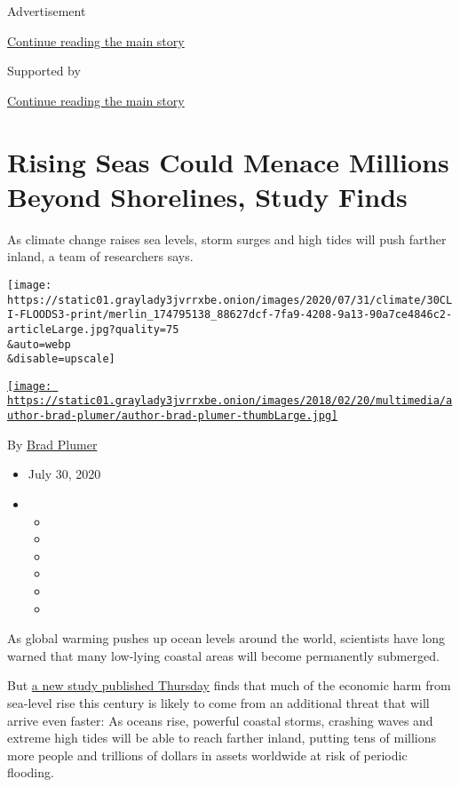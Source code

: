 Advertisement

\protect\hyperlink{after-top}{Continue reading the main story}

Supported by

\protect\hyperlink{after-sponsor}{Continue reading the main story}

\hypertarget{rising-seas-could-menace-millions-beyond-shorelines-study-finds}{%
\section{Rising Seas Could Menace Millions Beyond Shorelines, Study
Finds}\label{rising-seas-could-menace-millions-beyond-shorelines-study-finds}}

As climate change raises sea levels, storm surges and high tides will
push farther inland, a team of researchers says.

\texttt{[image: https://static01.graylady3jvrrxbe.onion/images/2020/07/31/climate/30CLI-FLOODS3-print/merlin\_174795138\_88627dcf-7fa9-4208-9a13-90a7ce4846c2-articleLarge.jpg?quality=75\\\&auto=webp\\\&disable=upscale]}

\href{https://www.nytimes3xbfgragh.onion/by/brad-plumer}{\texttt{[image: https://static01.graylady3jvrrxbe.onion/images/2018/02/20/multimedia/author-brad-plumer/author-brad-plumer-thumbLarge.jpg]}}

By \href{https://www.nytimes3xbfgragh.onion/by/brad-plumer}{Brad Plumer}

\begin{itemize}
\item
  July 30, 2020
\item
  \begin{itemize}
  \item
  \item
  \item
  \item
  \item
  \item
  \end{itemize}
\end{itemize}

As global warming pushes up ocean levels around the world, scientists
have long warned that many low-lying coastal areas will become
permanently submerged.

But \href{https://www.nature.com/articles/s41598-020-67736-6}{a new
study published Thursday} finds that much of the economic harm from
sea-level rise this century is likely to come from an additional threat
that will arrive even faster: As oceans rise, powerful coastal storms,
crashing waves and extreme high tides will be able to reach farther
inland, putting tens of millions more people and trillions of dollars in
assets worldwide at risk of periodic flooding.

